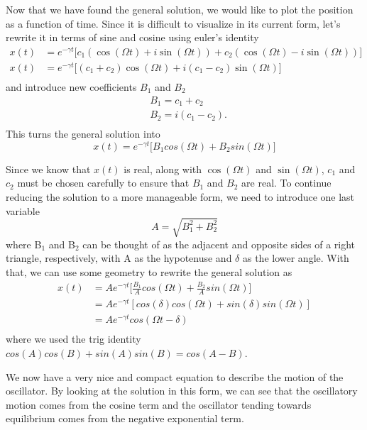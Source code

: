 \documentclass{article}
\newcommand{\be}{\begin{equation}}
\newcommand{\ee}{\end{equation}}
\begin{document}
Now that we have found the general solution, we would like to plot the position as a function of time.
Since it is difficult to visualize in its current form, let's rewrite it in terms of sine and cosine using euler's identity
\be
\begin{split}
x(t) &= e^{-\gamma t} \big[ c_1(\cos(\Omega t) + i \sin(\Omega t)) + c_2(\cos(\Omega t) - i \sin(\Omega t)) \big] \\
x(t) &= e^{-\gamma t} \big[ (c_1 + c_2)\cos(\Omega t) + i(c_1 - c_2)\sin(\Omega t) \big] \\
\end{split}
\ee
and introduce new coefficients $B_1$ and $B_2$
\be
\begin{split}
&B_1 = c_1 + c_2 \\
&B_2 = i(c_1 - c_2) . \\
\end{split}
\ee
This turns the general solution into
\be
x(t) = e^{-\gamma t} \big[ B_1 cos(\Omega t) + B_2 sin(\Omega t)]
\ee

Since we know that $x(t)$ is real, along with $\cos(\Omega t)$ and $\sin(\Omega t)$, $c_1$ and $c_2$ must be chosen carefully to ensure that $B_1$ and $B_2$ are real.
To continue reducing the solution to a more manageable form, we need to introduce one last variable
\be
A = \sqrt{B_1^2 + B_2^2}
\ee
where B$_1$ and B$_2$ can be thought of as the adjacent and opposite sides of a right triangle, respectively, with A as the hypotenuse and $\delta$ as the lower angle.
With that, we can use some geometry to rewrite the general solution as
\be
\begin{split}
x(t) &= Ae^{-\gamma t} \Big[\frac{B_1}{A}cos(\Omega t) + \frac{B_2}{A}sin(\Omega t) \Big]\\
 &= Ae^{-\gamma t} [cos(\delta)cos(\Omega t) + sin(\delta)sin(\Omega t)]\\
 &= Ae^{-\gamma t} cos(\Omega t - \delta)\\
\end{split}
\ee
where we used the trig identity $cos(A)cos(B) + sin(A)sin(B) = cos(A-B)$.

We now have a very nice and compact equation to describe the motion of the oscillator.
By looking at the solution in this form, we can see that the oscillatory motion comes from the cosine term and the oscillator tending towards equilibrium comes from the negative exponential term.
\end{document}
